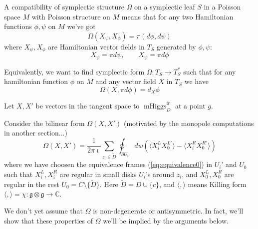 \documentclass[11pt, oneside, reqno]{amsart}
\theoremstyle{definition} \newtheorem{definition}{Definition}[section]
\theoremstyle{definition} \newtheorem{remark}[definition]{Remark}
\theoremstyle{definition} \newtheorem{remarks}[definition]{Remarks}
\theoremstyle{definition} \newtheorem{question}[definition]{Question}
\theoremstyle{definition} \newtheorem*{note}{Note}
\theoremstyle{definition} \newtheorem{example}[definition]{Example}
\theoremstyle{definition} \newtheorem{examples}[definition]{Examples}
\renewcommand{\gg}{\mathfrak{g}}
\DeclareMathOperator{\mhiggs}{mHiggs}
\newcommand{\fr}{\mathrm{fr}}
\begin{document}
 A compatibility of symplectic structure $\Omega$ on a symplectic leaf $S$ in a Poisson space $M$
 with Poisson structure on $M$  means that for any two Hamiltonian functions $\phi, \psi$ on $M$
 we've got
 \begin{equation}
\label{eq:compatibility}
   \Omega(X_{\psi}, X_{\phi}) = \pi (d\phi, d \psi)
 \end{equation}
 where $X_{\psi}, X_{\phi}$ are Hamiltonian vector fields in $T_{S}$ generated by $\phi, \psi$:
 \begin{equation}
   X_{\psi} = \pi d \psi, \qquad X_{\psi} = \pi d \phi 
 \end{equation}

 Equivalently, we want to find symplectic form $\Omega: T_{S} \to T_{S}^{*} $ such
 that for any hamiltonian function $\phi$ on $M$ and any vector field $X$ in $T_{S}$ we
 have
 \begin{equation}
   \Omega(X, \pi d \phi) = d_{X} \phi 
 \end{equation}

 Let $X, X'$ be vectors in the tangent space to $\mhiggs^{\fr}_D$ at a point $g$.

 Consider the bilinear form $\Omega(X, X')$ (motivated by the monopole
 computations in another section...) 
 \begin{equation}
\label{eq:Omega}
   \Omega(X, X')  = \frac{1}{2 \pi \imath} \sum_{z_i \in \tilde D} \oint_{\partial U_i}  dw (
\langle  X^{L}_{i} X^{L'}_{0} \rangle  - \langle X^{R}_{i}  X^{R'}_{0} \rangle )
\end{equation}
where we have choosen the equivalence frames (\ref{eq:equivalence0}) in $U_i$' and $U_0$ such that $X_i^{L}, X_i^{R}$ are regular in small disks $U_i$'s around $z_i$, and $X_0^{L}, X_{0}^{R}$ are regular in
the rest $U_0  = C \setminus \{\tilde D\}$.
Here $\tilde D = D \cup \{ c \}$, and $\langle, \rangle$ means Killing form $\langle, \rangle = \chi: \gg \otimes \gg \to \mathbb{C}$.

We don't yet assume that $\Omega$ is non-degenerate or antisymmetric. In fact, we'll show
that these properties of $\Omega$  we'll be implied by the arguments below. 
\end{document}
